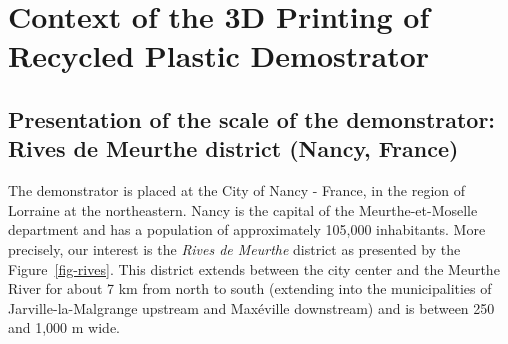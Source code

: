 \documentclass[
  11pt,
]{article}
\begin{document}
\newpage

\hypertarget{sec-context}{%
\section{Context of the 3D Printing of Recycled Plastic
Demostrator}\label{sec-context}}

\hypertarget{presentation-of-the-scale-of-the-demonstrator-rives-de-meurthe-district-nancy-france}{%
\subsection{Presentation of the scale of the demonstrator: Rives de
Meurthe district (Nancy,
France)}\label{presentation-of-the-scale-of-the-demonstrator-rives-de-meurthe-district-nancy-france}}

The demonstrator is placed at the City of Nancy - France, in the region
of Lorraine at the northeastern. Nancy is the capital of the
Meurthe-et-Moselle department and has a population of approximately
105,000 inhabitants. More precisely, our interest is the \emph{Rives de
Meurthe} district as presented by the Figure~\ref{fig-rives}. This
district extends between the city center and the Meurthe River for about
7 km from north to south (extending into the municipalities of
Jarville-la-Malgrange upstream and Maxéville downstream) and is between
250 and 1,000 m wide.
\end{document}
